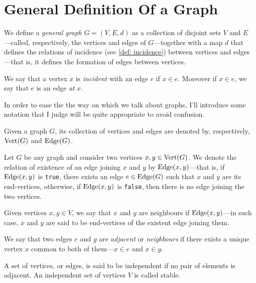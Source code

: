 \section{General Definition Of a Graph}

\begin{definition}\label{def: general-graph}
We define a \emph{general graph} \(G = (V, E, d)\) as a collection of disjoint
sets \(V\) and \(E\)---called, respectively, the vertices and edges of
\(G\)---together with a map \(d\) that defines the relations of incidence (see
\cref{def: incidence}) between vertices and edges---that is, it defines the
formation of edges between vertices.
\end{definition}

\begin{definition}[Incidence]\label{def: incidence}
We say that a vertex \(x\) is \emph{incident} with an edge \(e\) if \(x \in
e\). Moreover if \(x \in e\), we say that \(e\) is an edge \emph{at} \(x\).
\end{definition}

In order to ease the the way on which we talk about graphs, I'll introduce some
notation that I judge will be quite appropriate to avoid confusion.

\begin{notation}
Given a graph \(G\), its collection of vertices and edges are denoted by,
respectively, \(\operatorname{Vert}(G)\) and \(\operatorname{Edge}(G)\).
\end{notation}

\begin{notation}
Let \(G\) be any graph and consider two vertices \(x, y \in \operatorname{Vert}(G)\). We
denote the relation of existence of an edge joining \(x\) and \(y\) by
\(\operatorname{Edge}(x, y)\)---that is, if \(\operatorname{Edge}(x, y)\) is \texttt{true}, there exists
an edge \(e \in \operatorname{Edge}(G)\) such that \(x\) and \(y\) are its end-vertices,
otherwise, if \(\operatorname{Edge}(x, y)\) is \texttt{false}, then there is no edge joining
the two vertices.
\end{notation}

\begin{definition}[Adjacency]
Given vertices \(x, y \in V\), we say that \(x\) and \(y\) are neighbours if
\(\operatorname{Edge}(x, y)\)---in such case, \(x\) and \(y\) are said to be end-vertices of
the existent edge joining them.

We say that two edges \(e\) and \(g\) are \emph{adjacent} or \emph{neighbours}
if there exists a unique vertex \(x\) common to both of them---\(x \in e\)
and \(x \in g\).

A set of vertices, or edges, is said to be independent if no pair of elements
is adjacent. An independent set of vertices \(V\) is called stable.
\end{definition}

